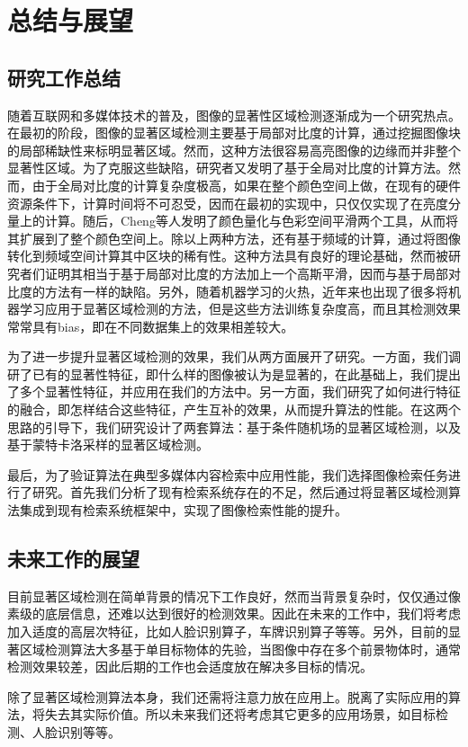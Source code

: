 \chapter{总结与展望}
\section{研究工作总结}
随着互联网和多媒体技术的普及，图像的显著性区域检测逐渐成为一个研究热点。在最初的阶段，图像的显著区域检测主要基于局部对比度的计算，通过挖掘图像块的局部稀缺性来标明显著区域。然而，这种方法很容易高亮图像的边缘而并非整个显著性区域。为了克服这些缺陷，研究者又发明了基于全局对比度的计算方法。然而，由于全局对比度的计算复杂度极高，如果在整个颜色空间上做，在现有的硬件资源条件下，计算时间将不可忍受，因而在最初的实现中，只仅仅实现了在亮度分量上的计算。随后，Cheng等人\cite{cheng2011global}发明了颜色量化与色彩空间平滑两个工具，从而将其扩展到了整个颜色空间上。除以上两种方法，还有基于频域的计算，通过将图像转化到频域空间计算其中区块的稀有性。这种方法具有良好的理论基础，然而被研究者们证明其相当于基于局部对比度的方法加上一个高斯平滑，因而与基于局部对比度的方法有一样的缺陷。另外，随着机器学习的火热，近年来也出现了很多将机器学习应用于显著区域检测的方法，但是这些方法训练复杂度高，而且其检测效果常常具有bias，即在不同数据集上的效果相差较大。

为了进一步提升显著区域检测的效果，我们从两方面展开了研究。一方面，我们调研了已有的显著性特征，即什么样的图像被认为是显著的，在此基础上，我们提出了多个显著性特征，并应用在我们的方法中。另一方面，我们研究了如何进行特征的融合，即怎样结合这些特征，产生互补的效果，从而提升算法的性能。在这两个思路的引导下，我们研究设计了两套算法：基于条件随机场的显著区域检测，以及基于蒙特卡洛采样的显著区域检测。

最后，为了验证算法在典型多媒体内容检索中应用性能，我们选择图像检索任务进行了研究。首先我们分析了现有检索系统存在的不足，然后通过将显著区域检测算法集成到现有检索系统框架中，实现了图像检索性能的提升。

\section{未来工作的展望}
目前显著区域检测在简单背景的情况下工作良好，然而当背景复杂时，仅仅通过像素级的底层信息，还难以达到很好的检测效果。因此在未来的工作中，我们将考虑加入适度的高层次特征，比如人脸识别算子，车牌识别算子等等。另外，目前的显著区域检测算法大多基于单目标物体的先验，当图像中存在多个前景物体时，通常检测效果较差，因此后期的工作也会适度放在解决多目标的情况。

除了显著区域检测算法本身，我们还需将注意力放在应用上。脱离了实际应用的算法，将失去其实际价值。所以未来我们还将考虑其它更多的应用场景，如目标检测、人脸识别等等。

